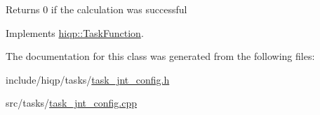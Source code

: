 \begin{DoxyReturn}{Returns}
0 if the calculation was successful 
\end{DoxyReturn}


Implements \hyperlink{classhiqp_1_1TaskFunction_a47a3283a0c0ebafa17feeca96afe5af0}{hiqp\-::\-Task\-Function}.



The documentation for this class was generated from the following files\-:\begin{DoxyCompactItemize}
\item 
include/hiqp/tasks/\hyperlink{task__jnt__config_8h}{task\-\_\-jnt\-\_\-config.\-h}\item 
src/tasks/\hyperlink{task__jnt__config_8cpp}{task\-\_\-jnt\-\_\-config.\-cpp}\end{DoxyCompactItemize}
